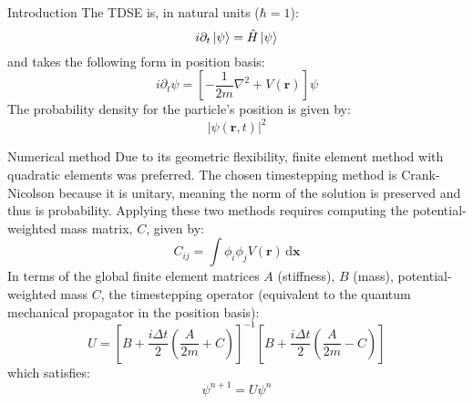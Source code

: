 \documentclass[final]{beamer}
\newlength{\onecolwid}
\begin{document}
\begin{frame}[t]
\begin{columns}[t]
\begin{column}{\onecolwid}
\begin{block}{Introduction}
The TDSE is, in natural units ($\hbar=1$):
\begin{equation}
i\partial_{t}\ket{\psi}=\hat{H}\ket{\psi}
\end{equation}
and takes the following form in position basis:
\begin{equation}
i\partial_{t}\psi=\left[-\frac{1}{2m}\nabla^{2}+V\left(\mathbf{r}\right)\right]\psi
\label{SchrodPosBasis}
\end{equation}
The probability density for the particle's position is given by:
\begin{equation}
\left|\psi\left(\mathbf{r},t\right)\right|^{2}
\end{equation}
\end{block}
\begin{block}{Numerical method}
Due to its geometric flexibility, finite element method with quadratic elements was preferred. The chosen timestepping method is Crank-Nicolson because it is unitary, meaning the norm of the solution is preserved and thus is probability. Applying these two methods requires computing the potential-weighted mass matrix, $C$, given by:
\begin{equation}
C_{ij} = \int\phi_{i}\phi_{j}V\left(\mathbf{r}\right)\,\mathrm{d}\mathbf{x}
\end{equation}
In terms of the global finite element matrices $A$ (stiffness), $B$ (mass), potential-weighted mass $C$, the timestepping operator (equivalent to the quantum mechanical propagator in the position basis):
\begin{equation}
U=\left[B+\frac{i\Delta t}{2}\left(\frac{A}{2m}+C\right)\right]^{-1}\left[B+\frac{i\Delta t}{2}\left(\frac{A}{2m}-C\right)\right]
\end{equation}
which satisfies:
\begin{equation}
\psi^{n+1}=U\psi^{n}
\end{equation}
\end{block}




\end{column}
\end{columns}
\end{frame}
\end{document}
